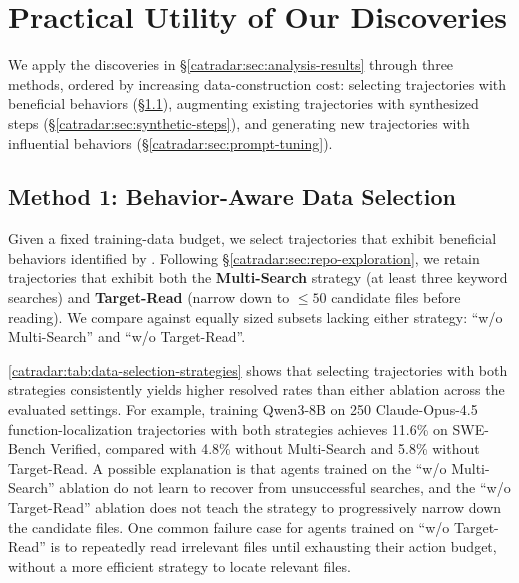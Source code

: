 \section{Practical Utility of Our Discoveries}
We apply the discoveries in \S\ref{catradar:sec:analysis-results} through three methods, ordered by increasing data-construction cost: selecting trajectories with beneficial behaviors (\S\ref{catradar:sec:data-selection}), augmenting existing trajectories with synthesized steps (\S\ref{catradar:sec:synthetic-steps}), and generating new trajectories with influential behaviors (\S\ref{catradar:sec:prompt-tuning}).

\subsection{Method 1: Behavior-Aware Data Selection}
\label{catradar:sec:data-selection}

Given a fixed training-data budget, we select trajectories that exhibit beneficial behaviors identified by \toolName.
Following \S\ref{catradar:sec:repo-exploration}, we retain trajectories that exhibit both the \textbf{Multi-Search} strategy (at least three keyword searches) and \textbf{Target-Read} (narrow down to $\leq 50$ candidate files before reading).
We compare against equally sized subsets lacking either strategy: ``w/o Multi-Search'' and ``w/o Target-Read''.

\autoref{catradar:tab:data-selection-strategies} shows that selecting trajectories with both strategies consistently yields higher resolved rates than either ablation across the evaluated settings.
For example, training Qwen3-8B on 250 Claude-Opus-4.5 function-localization trajectories with both strategies achieves 11.6\% on SWE-Bench Verified, compared with 4.8\% without Multi-Search and 5.8\% without Target-Read.
A possible explanation is that agents trained on the ``w/o Multi-Search'' ablation do not learn to recover from unsuccessful searches, and the ``w/o Target-Read'' ablation does not teach the strategy to progressively narrow down the candidate files.
One common failure case for agents trained on ``w/o Target-Read'' is to repeatedly read irrelevant files until exhausting their action budget, without a more efficient strategy to locate relevant files.

